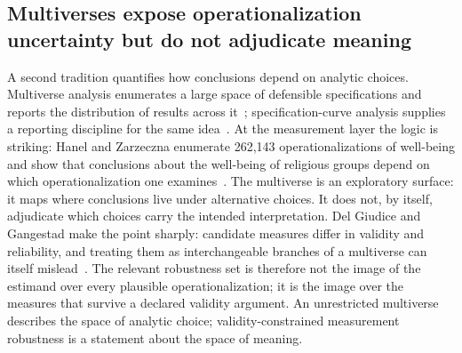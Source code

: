 \documentclass[10pt,letterpaper]{article}
\begin{document}
\subsection{Multiverses expose operationalization uncertainty but do not adjudicate meaning}
A second tradition quantifies how conclusions depend on analytic choices.
Multiverse analysis enumerates a large space of defensible specifications and reports the distribution of results across it~\cite{steegen2016}; specification-curve analysis supplies a reporting discipline for the same idea~\cite{simonsohn2020}.
At the measurement layer the logic is striking: Hanel and Zarzeczna enumerate 262{,}143 operationalizations of well-being and show that conclusions about the well-being of religious groups depend on which operationalization one examines~\cite{hanelzarzeczna2023}.
The multiverse is an exploratory surface: it maps where conclusions live under alternative choices.
It does not, by itself, adjudicate which choices carry the intended interpretation.
Del Giudice and Gangestad make the point sharply: candidate measures differ in validity and reliability, and treating them as interchangeable branches of a multiverse can itself mislead~\cite{delgiudice2021}.
The relevant robustness set is therefore not the image of the estimand over every plausible operationalization; it is the image over the measures that survive a declared validity argument.
An unrestricted multiverse describes the space of analytic choice; validity-constrained measurement robustness is a statement about the space of meaning.
\end{document}
